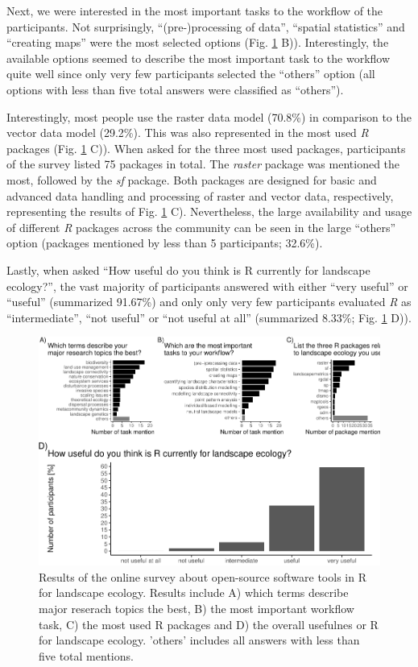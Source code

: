 \documentclass[smallextended]{svjour3}       %
\begin{document}
Next, we were interested in the most important tasks to the workflow of the participants. Not surprisingly, ``(pre-)processing of data'', ``spatial statistics'' and ``creating maps'' were the most selected options (Fig. \ref{fig:fig-survey} B)).
Interestingly, the available options seemed to describe the most important task to the workflow quite well since only very few participants selected the ``others'' option (all options with less than five total answers were classified as ``others'').

Interestingly, most people use the raster data model (70.8\%) in comparison to the vector data model (29.2\%).
This was also represented in the most used \emph{R} packages (Fig. \ref{fig:fig-survey} C)).
When asked for the three most used packages, participants of the survey listed 75 packages in total.
The \emph{raster} package was mentioned the most, followed by the \emph{sf} package.
Both packages are designed for basic and advanced data handling and processing of raster and vector data, respectively, representing the results of Fig. \ref{fig:fig-survey} C).
Nevertheless, the large availability and usage of different \emph{R} packages across the community can be seen in the large ``others'' option (packages mentioned by less than 5 participants; 32.6\%).

Lastly, when asked ``How useful do you think is R currently for landscape ecology?'', the vast majority of participants answered with either ``very useful'' or ``useful'' (summarized 91.67\%) and only only very few participants evaluated \emph{R} as ``intermediate'', ``not useful'' or ``not useful at all'' (summarized 8.33\%; Fig. \ref{fig:fig-survey} D)).

\begin{figure}

{\centering \includegraphics{paper_files/figure-latex/fig-survey-1} 

}

\caption{Results of the online survey about open-source software tools in R for landscape ecology. Results include A) which terms describe major reserach topics the best, B) the most important workflow task, C) the most used R packages and D) the overall usefulnes or R for landscape ecology. 'others' includes all answers with less than five total mentions.}\label{fig:fig-survey}
\end{figure}
\end{document}
